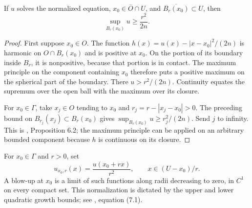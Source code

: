 \begin{proposition}\label{prop:obstacle-nondegeneracy}
If $u$ solves the normalized equation, $x_0\in\overline O\cap U$, and $\overline{B_r(x_0)}\subset U$, then
\[
 \sup_{B_r(x_0)}u\geq\frac{r^2}{2n}.
\]
\end{proposition}
\begin{proof}
First suppose $x_0\in O$. The function $h(x)=u(x)-|x-x_0|^2/(2n)$ is harmonic on $O\cap B_r(x_0)$ and is positive at $x_0$. On the portion of its boundary inside $B_r$, it is nonpositive, because that portion is in contact. The maximum principle on the component containing $x_0$ therefore puts a positive maximum on the spherical part of the boundary. There $u>r^2/(2n)$. Continuity equates the supremum over the open ball with the maximum over its closure.

For $x_0\in\Gamma$, take $x_j\in O$ tending to $x_0$ and $r_j=r-|x_j-x_0|>0$. The preceding bound on $B_{r_j}(x_j)\subset B_r(x_0)$ gives $\sup_{B_r(x_0)}u\geq r_j^2/(2n)$. Send $j$ to infinity. This is \cite{Fig18}, Proposition 6.2; the maximum principle can be applied on an arbitrary bounded component because $h$ is continuous on its closure.
\end{proof}

\begin{definition}\label{def:obstacle-rescaling}
For $x_0\in\Gamma$ and $r>0$, set
\[
 u_{x_0,r}(x)=\frac{u(x_0+rx)}{r^2},\qquad x\in(U-x_0)/r.
\]
A blow-up at $x_0$ is a limit of such functions along radii decreasing to zero, in $C^1$ on every compact set. This normalization is dictated by the upper and lower quadratic growth bounds; see \cite{Fig18}, equation (7.1).
\end{definition}

